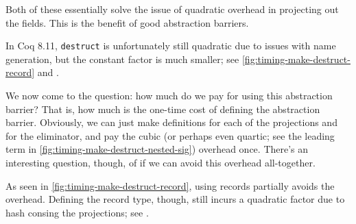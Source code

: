   Both of these essentially solve the issue of quadratic overhead in projecting out the fields.
  This is the benefit of good abstraction barriers.

  In Coq 8.11, \texttt{destruct} is unfortunately still quadratic due to issues with name generation, but the constant factor is much smaller; see \autoref{fig:timing-make-destruct-record} and .

  We now come to the question: how much do we pay for using this abstraction barrier?
  That is, how much is the one-time cost of defining the abstraction barrier.
  Obviously, we can just make definitions for each of the projections and for the eliminator, and pay the cubic (or perhaps even quartic; see the leading term in \autoref{fig:timing-make-destruct-nested-sig}) overhead once.
  There's an interesting question, though, of if we can avoid this overhead all-together.

  As seen in \autoref{fig:timing-make-destruct-record}, using records partially avoids the overhead.
  Defining the record type, though, still incurs a quadratic factor due to hash consing the projections; see .

